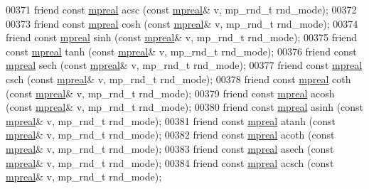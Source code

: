 \begin{DoxyCode}
00371     \textcolor{keyword}{friend} \textcolor{keyword}{const} \hyperlink{classmpfr_1_1mpreal}{mpreal} acsc  (\textcolor{keyword}{const} \hyperlink{classmpfr_1_1mpreal}{mpreal}& v, mp\_rnd\_t rnd\_mode);
00372 
00373     \textcolor{keyword}{friend} \textcolor{keyword}{const} \hyperlink{classmpfr_1_1mpreal}{mpreal} cosh  (\textcolor{keyword}{const} \hyperlink{classmpfr_1_1mpreal}{mpreal}& v, mp\_rnd\_t rnd\_mode);
00374     \textcolor{keyword}{friend} \textcolor{keyword}{const} \hyperlink{classmpfr_1_1mpreal}{mpreal} sinh  (\textcolor{keyword}{const} \hyperlink{classmpfr_1_1mpreal}{mpreal}& v, mp\_rnd\_t rnd\_mode);
00375     \textcolor{keyword}{friend} \textcolor{keyword}{const} \hyperlink{classmpfr_1_1mpreal}{mpreal} tanh  (\textcolor{keyword}{const} \hyperlink{classmpfr_1_1mpreal}{mpreal}& v, mp\_rnd\_t rnd\_mode);
00376     \textcolor{keyword}{friend} \textcolor{keyword}{const} \hyperlink{classmpfr_1_1mpreal}{mpreal} sech  (\textcolor{keyword}{const} \hyperlink{classmpfr_1_1mpreal}{mpreal}& v, mp\_rnd\_t rnd\_mode);
00377     \textcolor{keyword}{friend} \textcolor{keyword}{const} \hyperlink{classmpfr_1_1mpreal}{mpreal} csch  (\textcolor{keyword}{const} \hyperlink{classmpfr_1_1mpreal}{mpreal}& v, mp\_rnd\_t rnd\_mode);
00378     \textcolor{keyword}{friend} \textcolor{keyword}{const} \hyperlink{classmpfr_1_1mpreal}{mpreal} coth  (\textcolor{keyword}{const} \hyperlink{classmpfr_1_1mpreal}{mpreal}& v, mp\_rnd\_t rnd\_mode);
00379     \textcolor{keyword}{friend} \textcolor{keyword}{const} \hyperlink{classmpfr_1_1mpreal}{mpreal} acosh (\textcolor{keyword}{const} \hyperlink{classmpfr_1_1mpreal}{mpreal}& v, mp\_rnd\_t rnd\_mode);
00380     \textcolor{keyword}{friend} \textcolor{keyword}{const} \hyperlink{classmpfr_1_1mpreal}{mpreal} asinh (\textcolor{keyword}{const} \hyperlink{classmpfr_1_1mpreal}{mpreal}& v, mp\_rnd\_t rnd\_mode);
00381     \textcolor{keyword}{friend} \textcolor{keyword}{const} \hyperlink{classmpfr_1_1mpreal}{mpreal} atanh (\textcolor{keyword}{const} \hyperlink{classmpfr_1_1mpreal}{mpreal}& v, mp\_rnd\_t rnd\_mode);
00382     \textcolor{keyword}{friend} \textcolor{keyword}{const} \hyperlink{classmpfr_1_1mpreal}{mpreal} acoth (\textcolor{keyword}{const} \hyperlink{classmpfr_1_1mpreal}{mpreal}& v, mp\_rnd\_t rnd\_mode);
00383     \textcolor{keyword}{friend} \textcolor{keyword}{const} \hyperlink{classmpfr_1_1mpreal}{mpreal} asech (\textcolor{keyword}{const} \hyperlink{classmpfr_1_1mpreal}{mpreal}& v, mp\_rnd\_t rnd\_mode);
00384     \textcolor{keyword}{friend} \textcolor{keyword}{const} \hyperlink{classmpfr_1_1mpreal}{mpreal} acsch (\textcolor{keyword}{const} \hyperlink{classmpfr_1_1mpreal}{mpreal}& v, mp\_rnd\_t rnd\_mode);

\end{DoxyCode}
